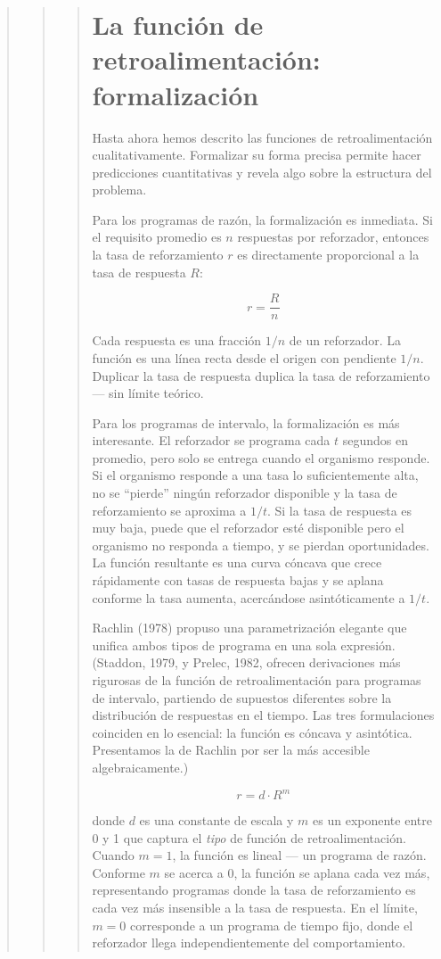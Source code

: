\documentclass[
  letterpaper,
  DIV=11,
  numbers=noendperiod]{scrreprt}
\begin{document}
\begin{tcolorbox}[enhanced jigsaw, arc=.35mm, bottomrule=.15mm, breakable, colback=white, colframe=quarto-callout-note-color-frame, left=2mm, leftrule=.75mm, opacityback=0, rightrule=.15mm, toprule=.15mm]
\begin{quote}
\begin{quote}
\begin{quote}
\mbox{}%
\section{La función de retroalimentación:
formalización}\label{la-funciuxf3n-de-retroalimentaciuxf3n-formalizaciuxf3n}

Hasta ahora hemos descrito las funciones de retroalimentación
cualitativamente. Formalizar su forma precisa permite hacer predicciones
cuantitativas y revela algo sobre la estructura del problema.

Para los programas de razón, la formalización es inmediata. Si el
requisito promedio es \(n\) respuestas por reforzador, entonces la tasa
de reforzamiento \(r\) es directamente proporcional a la tasa de
respuesta \(R\):

\[r = \frac{R}{n}\]

Cada respuesta es una fracción \(1/n\) de un reforzador. La función es
una línea recta desde el origen con pendiente \(1/n\). Duplicar la tasa
de respuesta duplica la tasa de reforzamiento --- sin límite teórico.

Para los programas de intervalo, la formalización es más interesante. El
reforzador se programa cada \(t\) segundos en promedio, pero solo se
entrega cuando el organismo responde. Si el organismo responde a una
tasa lo suficientemente alta, no se ``pierde'' ningún reforzador
disponible y la tasa de reforzamiento se aproxima a \(1/t\). Si la tasa
de respuesta es muy baja, puede que el reforzador esté disponible pero
el organismo no responda a tiempo, y se pierdan oportunidades. La
función resultante es una curva cóncava que crece rápidamente con tasas
de respuesta bajas y se aplana conforme la tasa aumenta, acercándose
asintóticamente a \(1/t\).

Rachlin (1978) propuso una parametrización elegante que unifica ambos
tipos de programa en una sola expresión. (Staddon, 1979, y Prelec, 1982,
ofrecen derivaciones más rigurosas de la función de retroalimentación
para programas de intervalo, partiendo de supuestos diferentes sobre la
distribución de respuestas en el tiempo. Las tres formulaciones
coinciden en lo esencial: la función es cóncava y asintótica.
Presentamos la de Rachlin por ser la más accesible algebraicamente.)

\[r = d \cdot R^m\]

donde \(d\) es una constante de escala y \(m\) es un exponente entre 0 y
1 que captura el \emph{tipo} de función de retroalimentación. Cuando
\(m = 1\), la función es lineal --- un programa de razón. Conforme \(m\)
se acerca a 0, la función se aplana cada vez más, representando
programas donde la tasa de reforzamiento es cada vez más insensible a la
tasa de respuesta. En el límite, \(m = 0\) corresponde a un programa de
tiempo fijo, donde el reforzador llega independientemente del
comportamiento.


\end{quote}
\end{quote}
\end{quote}
\end{tcolorbox}
\end{document}
